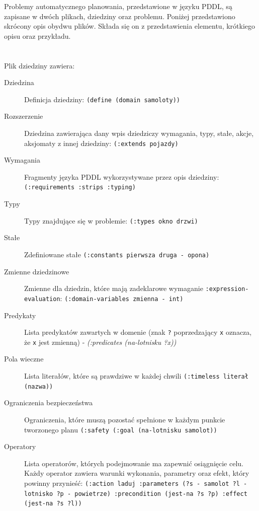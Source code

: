 Problemy automatycznego planowania, przedstawione w języku PDDL, są zapisane w dwóch plikach, dziedziny oraz problemu. Poniżej przedstawiono skrócony opis obydwu plików. Składa się on z przedstawienia elementu, krótkiego opisu oraz przykładu.
\\\\\\
Plik dziedziny zawiera:
  \begin{description}
\item[Dziedzina] Definicja dziedziny: \texttt{(define (domain samoloty))}
\item[Rozszerzenie] Dziedzina zawierająca dany wpis dziedziczy wymagania, typy, stałe, akcje, aksjomaty z innej dziedziny: \texttt{(:extends pojazdy) }
\item[Wymagania] Fragmenty języka PDDL wykorzystywane przez opis dziedziny: \texttt{(:requirements :strips :typing)}
\item[Typy] Typy znajdujące się w problemie: \texttt{(:types okno drzwi)}
\item[Stałe] Zdefiniowane stałe \texttt{(:constants pierwsza druga - opona)}
\item[Zmienne dziedzinowe] Zmienne dla dziedzin, które mają zadeklarowe wymaganie \texttt{:expression-evaluation}: \texttt{(:domain-variables zmienna - int)}
\item[Predykaty] Lista predykatów zawartych w domenie (znak \texttt{?} poprzedzający \texttt{x} oznacza, że \texttt{x} jest zmienną) -  \textit{(:predicates (na-lotnisku ?x))}
\item[Pola wieczne] Lista literałów, które są prawdziwe w każdej chwili \texttt{(:timeless literał (nazwa))}
\item[Ograniczenia bezpieczeństwa] Ograniczenia, które muszą pozostać spełnione w każdym punkcie tworzonego planu \texttt{(:safety (:goal (na-lotnisku samolot))}
\item[Operatory] Lista operatorów, których podejmowanie ma zapewnić osiągnięcie celu. Każdy operator zawiera warunki wykonania, parametry oraz efekt, który powinny przynieść: \texttt{(:action laduj :parameters (?s - samolot ?l - lotnisko ?p - powietrze) :precondition (jest-na ?s ?p) :effect (jest-na ?s ?l)) }\\
\end{description}


